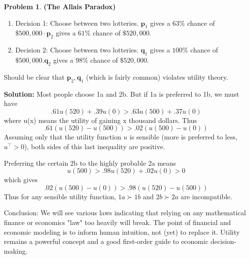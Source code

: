 \documentclass[13pt]{article}
\theoremstyle{definition}
\newtheorem{problem}[theorem]{Problem}
\newenvironment{solution}
{\color{C2}\begin{framed}\begingroup\textbf{Solution:} }
  {\endgroup\end{framed}}
\theoremstyle{remark}
\begin{document}
\begin{problem}\textbf{(The Allais Paradox)}\hfill
\begin{enumerate}[label=(\arabic*)]
    \item Decision 1: Choose between two lotteries. $\mathbf{p}_{1}$ gives a $63 \%$ chance of $\$ 500,000 \cdot \mathbf{p}_{2}$ gives a $61 \%$ chance of $\$ 520,000$.
    \item Decision 2: Choose between two lotteries. $\mathbf{q}_{1}$ gives a $100 \%$ chance of $\$ 500,000 . \mathbf{q}_{2}$ gives a $98 \%$ chance of $\$ 520,000$.
\end{enumerate}
Should be clear that $\mathbf{p}_{2}, \mathbf{q}_{1}$ (which is fairly common) violates utility theory.

\begin{solution}
    Most people choose 1a and 2b. But if 1a is preferred to 1b, we must have
$$.61u(520)+.39u(0)>.63u(500)+.37u(0)$$
where u(x) means the utility of gaining x thousand dollars. Thus
$$.61(u(520)-u(500))>.02(u(500)-u(0))$$
Assuming only that the utility function $u$ is sensible (more is preferred to less, $u^{\top}>0$), both sides of this last inequality are positive.

Preferring the certain 2b to the highly probable 2a means
$$u(500)>.98u(520)+.02u(0)>0$$
which gives
$$.02(u(500)-u(0))>.98(u(520)-u(500))$$
Thus for any sensible utility function, $1a\succ 1b$ and $2b\succ 2a$ are incompatible.
\end{solution}
\end{problem}

{\color{C3}Conclusion:} We will see various laws indicating that relying on any mathematical finance or economics "law" too heavily will break. The point of financial and economic modeling is to inform human intuition, not (yet) to replace it. Utility remains a powerful concept and a good first-order guide to economic decision-making. 

\end{document}
